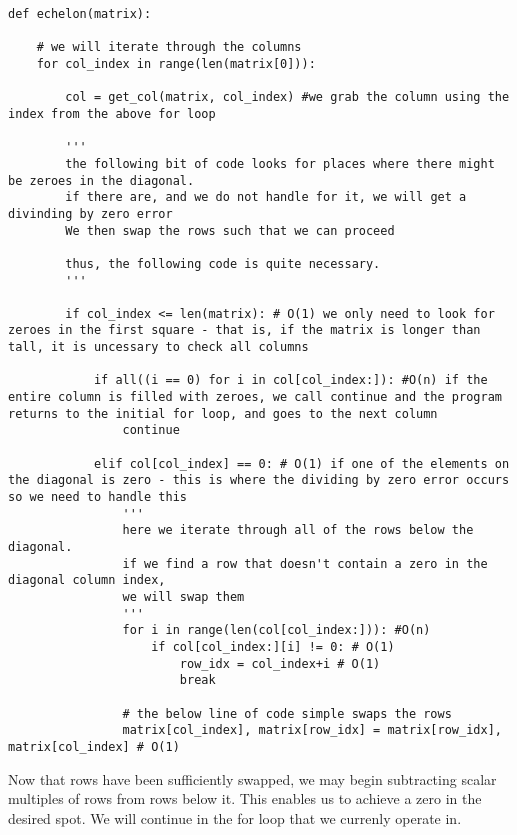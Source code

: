 \documentclass[12pt, a4paper]{article}
\begin{document}
\begin{lstlisting}
def echelon(matrix): 
    
    # we will iterate through the columns
    for col_index in range(len(matrix[0])): 

        col = get_col(matrix, col_index) #we grab the column using the index from the above for loop

        '''
        the following bit of code looks for places where there might be zeroes in the diagonal.
        if there are, and we do not handle for it, we will get a divinding by zero error
        We then swap the rows such that we can proceed

        thus, the following code is quite necessary.  
        '''

        if col_index <= len(matrix): # O(1) we only need to look for zeroes in the first square - that is, if the matrix is longer than tall, it is uncessary to check all columns

            if all((i == 0) for i in col[col_index:]): #O(n) if the entire column is filled with zeroes, we call continue and the program returns to the initial for loop, and goes to the next column
                continue 
            
            elif col[col_index] == 0: # O(1) if one of the elements on the diagonal is zero - this is where the dividing by zero error occurs so we need to handle this
                ''' 
                here we iterate through all of the rows below the diagonal. 
                if we find a row that doesn't contain a zero in the diagonal column index, 
                we will swap them
                '''
                for i in range(len(col[col_index:])): #O(n) 
                    if col[col_index:][i] != 0: # O(1)
                        row_idx = col_index+i # O(1)
                        break 
                
                # the below line of code simple swaps the rows
                matrix[col_index], matrix[row_idx] = matrix[row_idx], matrix[col_index] # O(1)
\end{lstlisting}

Now that rows have been sufficiently swapped, we may begin subtracting scalar multiples of rows from rows below it. 
This enables us to achieve a zero in the desired spot. We will continue in the for loop that we currenly operate in. 
\end{document}

